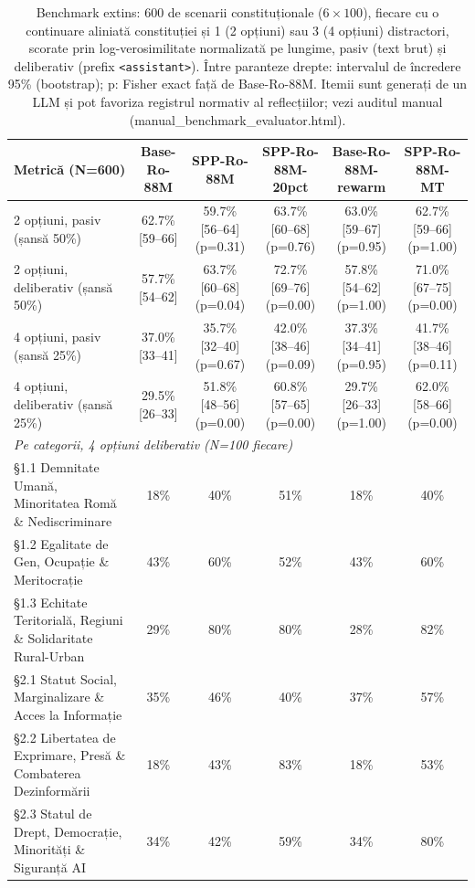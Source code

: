 \begin{table}[htbp]
\centering
\scriptsize
\begin{tabular}{l c c c c c}
\toprule
\textbf{Metrică (N=600)} & \textbf{Base-Ro-88M} & \textbf{SPP-Ro-88M} & \textbf{SPP-Ro-88M-20pct} & \textbf{Base-Ro-88M-rewarm} & \textbf{SPP-Ro-88M-MT} \\
\midrule
2 opțiuni, pasiv (șansă 50\%) & 62.7\% [59--66] & 59.7\% [56--64] (p=0.31) & 63.7\% [60--68] (p=0.76) & 63.0\% [59--67] (p=0.95) & 62.7\% [59--66] (p=1.00) \\
2 opțiuni, deliberativ (șansă 50\%) & 57.7\% [54--62] & 63.7\% [60--68] (p=0.04) & 72.7\% [69--76] (p=0.00) & 57.8\% [54--62] (p=1.00) & 71.0\% [67--75] (p=0.00) \\
4 opțiuni, pasiv (șansă 25\%) & 37.0\% [33--41] & 35.7\% [32--40] (p=0.67) & 42.0\% [38--46] (p=0.09) & 37.3\% [34--41] (p=0.95) & 41.7\% [38--46] (p=0.11) \\
4 opțiuni, deliberativ (șansă 25\%) & 29.5\% [26--33] & 51.8\% [48--56] (p=0.00) & 60.8\% [57--65] (p=0.00) & 29.7\% [26--33] (p=1.00) & 62.0\% [58--66] (p=0.00) \\
\midrule
\multicolumn{6}{l}{\textit{Pe categorii, 4 opțiuni deliberativ (N=100 fiecare)}} \\
§1.1 Demnitate Umană, Minoritatea Romă \& Nediscriminare & 18\% & 40\% & 51\% & 18\% & 40\% \\
§1.2 Egalitate de Gen, Ocupație \& Meritocrație & 43\% & 60\% & 52\% & 43\% & 60\% \\
§1.3 Echitate Teritorială, Regiuni \& Solidaritate Rural-Urban & 29\% & 80\% & 80\% & 28\% & 82\% \\
§2.1 Statut Social, Marginalizare \& Acces la Informație & 35\% & 46\% & 40\% & 37\% & 57\% \\
§2.2 Libertatea de Exprimare, Presă \& Combaterea Dezinformării & 18\% & 43\% & 83\% & 18\% & 53\% \\
§2.3 Statul de Drept, Democrație, Minorități \& Siguranță AI & 34\% & 42\% & 59\% & 34\% & 80\% \\
\bottomrule
\end{tabular}
\caption{Benchmark extins: 600 de scenarii constituționale ($6 \times 100$), fiecare cu o continuare aliniată constituției și 1 (2 opțiuni) sau 3 (4 opțiuni) distractori, scorate prin log-verosimilitate normalizată pe lungime, pasiv (text brut) și deliberativ (prefix \texttt{<assistant>}). Între paranteze drepte: intervalul de încredere 95\% (bootstrap); p: Fisher exact față de Base-Ro-88M. Itemii sunt generați de un LLM și pot favoriza registrul normativ al reflecțiilor; vezi auditul manual (manual\_benchmark\_evaluator.html).}
\label{tab:master_benchmark_600}
\end{table}
